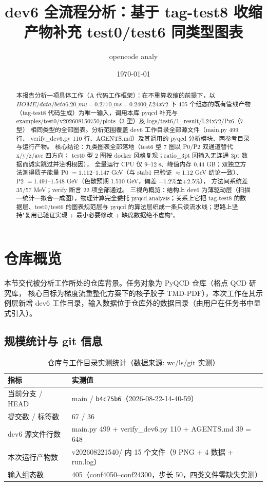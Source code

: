 \documentclass[UTF8]{ctexart}
\title{dev6 全流程分析：基于 tag-test8 收缩产物补充 test0/test6 同类型图表}
\author{opencode analy}
\date{\today}
\begin{document}
\maketitle

\begin{abstract}
本报告分析一项具体工作（A 代码工作框架）：在不重算收缩的前提下，以
${HOME}/data/beta6.20\_mu-0.2770\_ms-0.2400\_L24x72$ 下 405 个组态的既有管线产物
（tag-test8 代码生成）为唯一输入，调用本库 pyqcd 补充与
examples/test0/v202608150750/plots（3 型）及 logs/test6/1\_result/L24x72/Pz6（7 型）
相同类型的全部图表。分析范围覆盖 dev6 工作目录全部源文件（main.py 499 行、
verify\_dev6.py 110 行、AGENTS.md）及其调用的 pyqcd 分析模块、两参考目录与运行产物。
核心结论：九类图表全部落地（test6 型 7 图以 P0/P2 双通道替代 x/y/z/ave 四方向；
test0 型 2 图按 docker 风格复现；ratio\_3pt 因输入无连通 3pt 数据而诚实跳过并注明根因），
全量运行 CPU 仅 9--12 s、峰值内存 0.44 GB；双独立方法测得质子能量
P0 $=1.112$--$1.147$ GeV（与 stab1 已验证 $\approx$1.12 GeV 结论一致）、
P2 $=1.491$--$1.548$ GeV（色散预期 1.510 GeV，偏差 $-1.2\%$至$+2.5\%$），
方法间系统差 35/57 MeV；verify 断言 22 项全部通过。
三视角概览：结构上 dev6 为薄驱动层（扫描—统计—拟合—成图），物理计算完全委托
pyqcd.analysis；关系上它把 tag-test8 的数据层、test0/test6 的图表规范层与
pyqcd 的算法层织成一条只读流水线；思路上坚持"复用已验证实现 + 最小必要修改 +
缺席数据绝不虚构"。
\end{abstract}

\tableofcontents

\section{仓库概览}
本节交代被分析工作所处的仓库背景。任务对象为 PyQCD 仓库（格点 QCD 研究库，
核心目标为梯度流重整化方案下的核子胶子 TMD-PDF），本次工作在其示例层新增
dev6 工作目录，输入数据位于仓库外的数据目录（由用户在任务书中显式引入）。

\subsection{规模统计与 git 信息}
\begin{table}[htbp]\centering
\begin{tabular}{ll}
\toprule
指标 & 实测值 \\
\midrule
当前分支 / HEAD & main / \texttt{\nolinkurl{b4c75b6}}（2026-08-22-14-40-59）\\
提交数 / 标签数 & 67 / 36 \\
dev6 源文件行数 & main.py 499 + verify\_dev6.py 110 + AGENTS.md 39 = 648 \\
本次运行产物数 & v202608221540/ 内 15 个文件（9 PNG + 4 数据 + run.log）\\
输入组态数 & 405（conf4050--conf24300，步长 50，四类文件零缺失实测）\\
\bottomrule
\end{tabular}
\caption{仓库与工作目录实测统计（数据来源: wc/ls/git 实测）}
\end{table}
\end{document}
